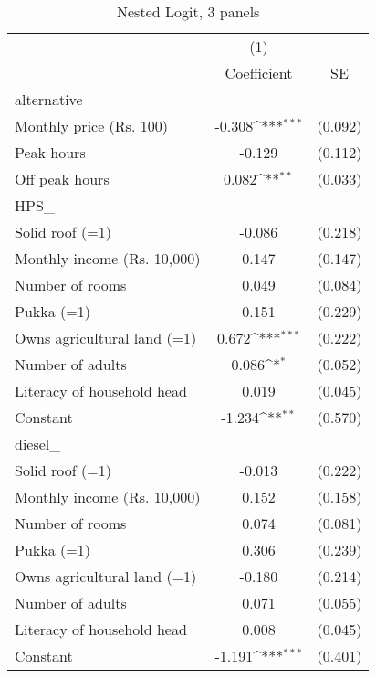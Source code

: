 \begin{table}[htbp]\centering
\def\sym#1{\ifmmode^{#1}\else\(^{#1}\)\fi}
\caption{Nested Logit, 3 panels}
\begin{tabular}{l*{1}{cc}}
\toprule
                    &\multicolumn{1}{c}{(1)}         &            \\
                    & Coefficient         &          SE\\
\midrule
alternative         &                     &            \\
Monthly price (Rs. 100)&      -0.308\sym{***}&     (0.092)\\
Peak hours          &      -0.129         &     (0.112)\\
Off peak hours      &       0.082\sym{**} &     (0.033)\\
\midrule
HPS\_                &                     &            \\
Solid roof (=1)     &      -0.086         &     (0.218)\\
Monthly income (Rs. 10,000)&       0.147         &     (0.147)\\
Number of rooms     &       0.049         &     (0.084)\\
Pukka (=1)          &       0.151         &     (0.229)\\
Owns agricultural land (=1)&       0.672\sym{***}&     (0.222)\\
Number of adults    &       0.086\sym{*}  &     (0.052)\\
Literacy of household head&       0.019         &     (0.045)\\
Constant            &      -1.234\sym{**} &     (0.570)\\
\midrule
diesel\_             &                     &            \\
Solid roof (=1)     &      -0.013         &     (0.222)\\
Monthly income (Rs. 10,000)&       0.152         &     (0.158)\\
Number of rooms     &       0.074         &     (0.081)\\
Pukka (=1)          &       0.306         &     (0.239)\\
Owns agricultural land (=1)&      -0.180         &     (0.214)\\
Number of adults    &       0.071         &     (0.055)\\
Literacy of household head&       0.008         &     (0.045)\\
Constant            &      -1.191\sym{***}&     (0.401)\\

\end{tabular}
\end{table}
